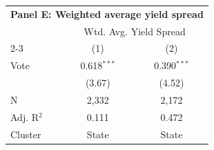 \begingroup
\centering
\begin{tabular*}{\textwidth}{@{\extracolsep{\fill}}lcc}
\multicolumn{3}{l}{\textbf{Panel E: Weighted average yield spread}}\\

\addlinespace
   \toprule
    & \multicolumn{2}{c}{Wtd. Avg. Yield Spread}\\
   \cmidrule(lr){2-3}
                  & (1)           & (2)\\  
   \midrule 
   Vote           & 0.618$^{***}$ & 0.390$^{***}$\\   
                  & (3.67)       & (4.52)\\   
   \hline
   N   & 2,332         & 2,172\\  
   Adj. R$^2$ & 0.111         & 0.472\\  
   Cluster              & State & State\\  
   \bottomrule
\end{tabular*}
\par\endgroup
